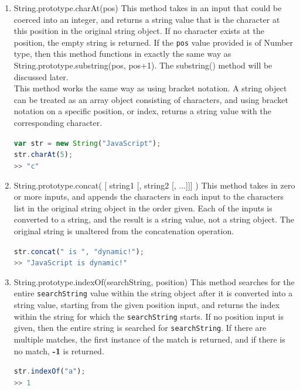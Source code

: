 \documentclass[a4paper,11pt,twoside]{report}
\def\jsinline{\lstinline[language=JavaScript, basicstyle=\small]}%\end{lstlisting}
\begin{document}
\begin{enumerate}
\item String.prototype.charAt(pos) \newline
This method takes in an input that could be coerced into an integer, and returns a string value that is the character at this position in the original string object. If no character exists at the position, the empty string is returned. If the \jsinline|pos| value provided is of Number type, then this method functions in exactly the same way as String.prototype.substring(pos, pos+1). The substring() method will be discussed later. \\
This method works the same way as using bracket notation. A string object can be treated as an array object consisting of characters, and using bracket notation on a specific position, or index, returns a string value with the corresponding character.

\jsinline|var str = new String("JavaScript");| \\
\jsinline|str.charAt(5);| \\
\jsinline|>> "c"|

\item String.prototype.concat( [ string1 [, string2 [, ...]]] ) \newline
This method takes in zero or more inputs, and appends the characters in each input to the characters list in the original string object in the order given. Each of the inputs is converted to a string, and the result is a string value, not a string object. The original string is unaltered from the concatenation operation.

\jsinline|str.concat(" is ", "dynamic!");| \\
\jsinline|>> "JavaScript is dynamic!"|

\item String.prototype.indexOf(searchString, position) \newline
This method searches for the entire \jsinline|searchString| value within the string object after it is converted into a string value, starting from the given position input, and returns the index within the string for which the \jsinline|searchString| starts. If no position input is given, then the entire string is searched for \jsinline|searchString|. If there are multiple matches, the first instance of the match is returned, and if there is no match, \textbf{-1} is returned.

\jsinline|str.indexOf("a");| \\
\jsinline|>> 1|


\end{enumerate}
\end{document}

